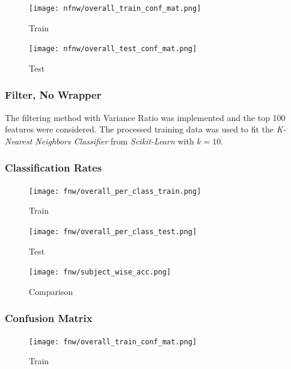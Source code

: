 \documentclass[12pt,twoside,a4paper]{article}
\begin{document}
\begin{figure}[H]
    \centering
    \texttt{[image: nfnw/overall\_train\_conf\_mat.png]}
    \caption{Train}
    \label{fig: NFW4}
\end{figure}

\begin{figure}[H]
    \centering
    \texttt{[image: nfnw/overall\_test\_conf\_mat.png]}
    \caption{Test}
    \label{fig: NFW5}
\end{figure}

\subsubsection{Filter, No Wrapper}

The filtering method with Variance Ratio was implemented and the top 100 features were considered. The processed training data was used to fit the \textit{K-Nearest Neighbors Classifier} from \textit{Scikit-Learn} with $k=10$.

\subsubsection*{Classification Rates}

\begin{figure}[H]
    \centering
    \texttt{[image: fnw/overall\_per\_class\_train.png]}
    \caption{Train}
    \label{fig: F1}
\end{figure}

\begin{figure}[H]
    \centering
    \texttt{[image: fnw/overall\_per\_class\_test.png]}
    \caption{Test}
    \label{fig: F2}
\end{figure}

\begin{figure}[H]
    \centering
    \texttt{[image: fnw/subject\_wise\_acc.png]}
    \caption{Comparison}
    \label{fig: F3}
\end{figure}

\subsubsection*{Confusion Matrix}

\begin{figure}[H]
    \centering
    \texttt{[image: fnw/overall\_train\_conf\_mat.png]}
    \caption{Train}
    \label{fig: F4}
\end{figure}
\end{document}
